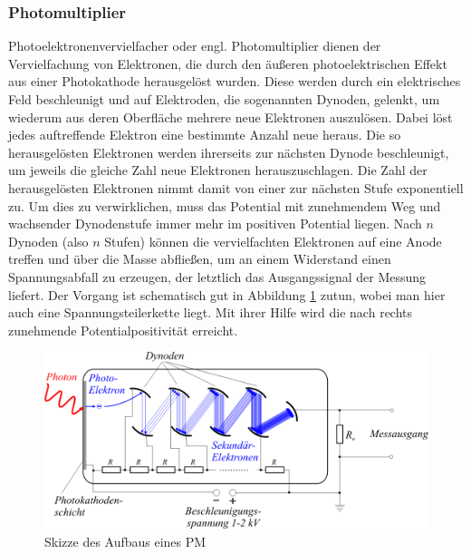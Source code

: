         \subsubsection{Photomultiplier}
            Photoelektronenvervielfacher oder engl. Photomultiplier dienen der Vervielfachung von Elektronen, die durch den äußeren photoelektrischen Effekt aus einer Photokathode herausgelöst wurden. Diese werden durch ein elektrisches Feld beschleunigt und auf Elektroden, die sogenannten Dynoden, gelenkt, um wiederum aus deren Oberfläche mehrere neue Elektronen auszulösen. Dabei löst jedes auftreffende Elektron eine bestimmte Anzahl neue heraus. Die so herausgelösten Elektronen werden ihrerseits zur nächsten Dynode beschleunigt, um jeweils die gleiche Zahl neue Elektronen herauszuschlagen. Die Zahl der herausgelösten Elektronen nimmt damit von einer zur nächsten Stufe exponentiell zu. Um dies zu verwirklichen, muss das Potential mit zunehmendem Weg und wachsender Dynodenstufe immer mehr im positiven Potential liegen. Nach $n$ Dynoden (also $n$ Stufen) können die vervielfachten Elektronen auf eine Anode treffen und über die Masse abfließen, um an einem Widerstand einen Spannungsabfall zu erzeugen, der letztlich das Ausgangssignal der Messung liefert.
            Der Vorgang ist schematisch gut in Abbildung \ref{pm} zutun, wobei man hier auch eine Spannungsteilerkette liegt. Mit ihrer Hilfe wird die nach rechts zunehmende Potentialpositivität erreicht. 
            \begin{figure}[htbp]
                \centering \includegraphics[scale=1]{pic/pm.png}
                \caption{Skizze des Aufbaus eines PM \cite{pm}}
                \label{pm}
            \end{figure}
